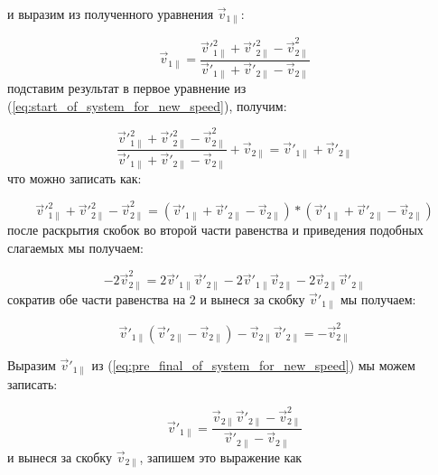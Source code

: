 \documentclass{article}
\begin{document}
и выразим из полученного уравнения $ \vec{v}_{1\parallel} $:

\begin{equation}
    \vec{v}_{1\parallel} = \frac{\vec{v}'^2_{1\parallel} + \vec{v}'^2_{2\parallel} - \vec{v}^2_{2\parallel}}{\vec{v}'_{1\parallel} + \vec{v}'_{2\parallel} - \vec{v}_{2\parallel}}
\end{equation}
подставим результат в первое уравнение из (\ref{eq:start_of_system_for_new_speed}), получим:

\begin{equation}
    \frac{\vec{v}'^2_{1\parallel} + \vec{v}'^2_{2\parallel} - \vec{v}^2_{2\parallel}}{\vec{v}'_{1\parallel} + \vec{v}'_{2\parallel} - \vec{v}_{2\parallel}} + \vec{v}_{2\parallel} = \vec{v}'_{1\parallel} + \vec{v}'_{2\parallel}
\end{equation}
что можно записать как:

\begin{equation}
    \vec{v}'^2_{1\parallel} + \vec{v}'^2_{2\parallel} - \vec{v}^2_{2\parallel} = (\vec{v}'_{1\parallel} + \vec{v}'_{2\parallel} - \vec{v}_{2\parallel})*(\vec{v}'_{1\parallel} + \vec{v}'_{2\parallel} - \vec{v}_{2\parallel})
\end{equation}
после раскрытия скобок во второй части равенства и приведения подобных слагаемых мы получаем:

\begin{equation}
    -2 \vec{v}^2_{2\parallel} = 2 \vec{v}'_{1\parallel} \vec{v}'_{2\parallel} - 2 \vec{v}'_{1\parallel} \vec{v}_{2\parallel} - 2 \vec{v}_{2\parallel} \vec{v}'_{2\parallel}
\end{equation}
сократив обе части равенства на $ 2 $ и вынеся за скобку $ \vec{v}'_{1\parallel} $ мы получаем:

\begin{equation}\label{eq:pre_final_of_system_for_new_speed}
    \vec{v}'_{1\parallel} (\vec{v}'_{2\parallel} - \vec{v}_{2\parallel}) - \vec{v}_{2\parallel} \vec{v}'_{2\parallel} = -\vec{v}^2_{2\parallel} 
\end{equation}

Выразим $ \vec{v}'_{1\parallel} $ из (\ref{eq:pre_final_of_system_for_new_speed}) мы можем записать:

\begin{equation}
    \vec{v}'_{1\parallel} = \frac{\vec{v}_{2\parallel} \vec{v}'_{2\parallel} - \vec{v}^2_{2\parallel}}{\vec{v}'_{2\parallel} - \vec{v}_{2\parallel}}
\end{equation}
и вынеся за скобку $ \vec{v}_{2\parallel} $, запишем это выражение как
\end{document}
